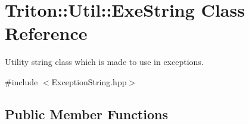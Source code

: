 \hypertarget{class_triton_1_1_util_1_1_exe_string}{}\section{Triton\+:\+:Util\+:\+:Exe\+String Class Reference}
\label{class_triton_1_1_util_1_1_exe_string}


Utility string class which is made to use in exceptions.  




{\ttfamily \#include $<$Exception\+String.\+hpp$>$}

\subsection*{Public Member Functions}
